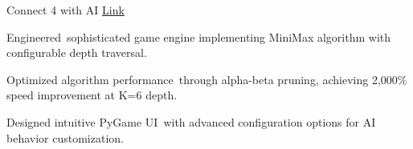 

\begin{cventries}

  \cventry
    {Connect 4 with AI} %
    {} %
    {}
    {\textcolor{link}{\href{https://github.com/ad3ldev/Connect4-with-AI}{Link}}} %
    {
      \begin{cvitems} %
        \item {Engineered sophisticated game engine implementing MiniMax algorithm with configurable depth traversal.}
        \item {Optimized algorithm performance through alpha-beta pruning, achieving 2,000\% speed improvement at K=6 depth.}
        \item {Designed intuitive PyGame UI with advanced configuration options for AI behavior customization.}
      \end{cvitems}
    }
    
\end{cventries}
